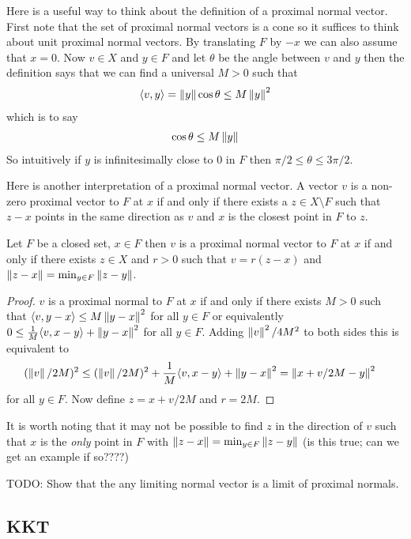 Here is a useful way to think about the definition of a proximal normal vector.  First note that the set of proximal normal vectors is a cone so it suffices to think about unit proximal normal vectors.  By translating $F$ by $-x$ we can also assume that $x=0$.  Now $v \in X$ and $y \in F$ and let $\theta$ be the angle between $v$ and $y$ then the 
definition says that we can find a universal $M > 0$ such that
\begin{align*}
\langle v, y \rangle = \left \lVert y \right \rVert \cos \theta \leq M \left \lVert y \right \rVert^2
\end{align*}
which is to say
\begin{align*}
\cos \theta \leq M \left \lVert y \right \rVert
\end{align*}
So intuitively if $y$ is infinitesimally close to $0$ in $F$ then $\pi/2 \leq \theta \leq 3\pi/2$.  

Here is another interpretation of a proximal normal vector.  A vector $v$ is a non-zero proximal vector to $F$ at $x$ if and only if there exists a $z \in X \setminus F$ such that $z -x$ points in the same direction as $v$ and $x$ is the closest point in $F$ to $z$.  
\begin{prop}\label{ProximalNormalVectorRealizedByBalls}Let $F$ be a closed set, $x \in F$ then $v$ is a proximal normal vector to $F$ at $x$ if and only if there exists $z \in X$ and $r > 0$ such that $v = r (z - x)$ and 
$\left \lVert z - x \right \rVert = \min_{y \in F} \left \lVert z - y \right \rVert$.
\end{prop}
\begin{proof}
$v$ is a proximal normal to $F$ at $x$ if and only if there exists $M > 0$ such that $\langle v, y - x \rangle \leq M \left \lVert y - x \right \rVert^2$ for all $y \in F$ or equivalently $0 \leq \frac{1}{M} \langle v, x - y \rangle + \left \lVert y - x \right \rVert^2$ for all $y \in F$.  Adding $\left \lVert v \right \rVert^2/4M^2$ to both sides this is equivalent to 
\begin{align*}
(\left \lVert v \right \rVert/2M)^2 &\leq (\left \lVert v \right \rVert/2M)^2 + \frac{1}{M} \langle v, x - y \rangle + \left \lVert y - x \right \rVert^2 = \left \lVert  x + v/2M - y \right \rVert^2
\end{align*}
for all $y \in F$. Now define $z = x + v/2M$ and $r = 2M$.
\end{proof}
It is worth noting that it may not be possible to find $z$ in the direction of $v$ such that $x$ is the \emph{only} point in $F$ with $\left \lVert z-x \right \rVert = \min_{y \in F} \left \lVert z-y \right \rVert$ (is this true; can we get an example if so????)

TODO: Show that the any limiting normal vector is a limit of proximal normals.

\subsection{KKT}

